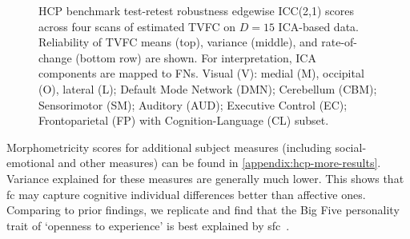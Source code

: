 \begin{figure}[t]
  \caption{
    HCP benchmark test-retest robustness edgewise ICC(2,1) scores across four scans of estimated TVFC on $D = 15$ ICA-based data.
    Reliability of TVFC means (top), variance (middle), and rate-of-change (bottom row) are shown.
    For interpretation, ICA components are mapped to FNs.
    Visual (V): medial (M), occipital (O), lateral (L); Default Mode Network (DMN); Cerebellum (CBM); Sensorimotor (SM); Auditory (AUD); Executive Control (EC); Frontoparietal (FP) with Cognition-Language (CL) subset.
  }
  \label{fig:hcp-results-test-retest-ICCs-d15}
\end{figure}


Morphometricity scores for additional subject measures (including social-emotional and other measures) can be found in \cref{appendix:hcp-more-results}.
Variance explained for these measures are generally much lower.
This shows that \gls{fc} may capture cognitive individual differences better than affective ones.
Comparing to prior findings, we replicate \textcite{Dubois2018} and find that the Big Five personality trait of `openness to experience' is best explained by \gls{sfc}~\parencite[see also][]{Beaty2018}.


